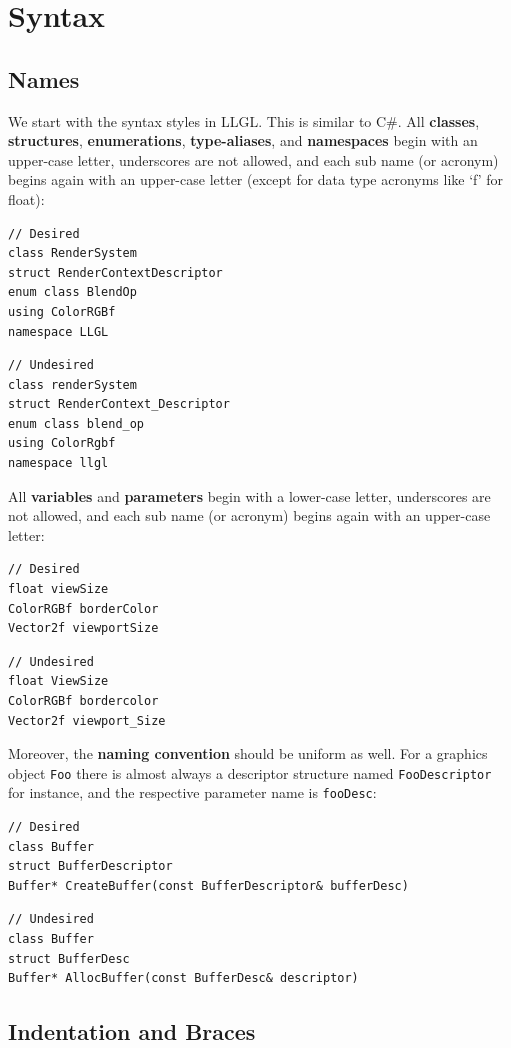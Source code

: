 \documentclass{article}
\begin{document}
\newpage
\section*{Syntax}

\subsection*{Names}

We start with the syntax styles in LLGL. This is similar to C\#.
All \textbf{classes}, \textbf{structures}, \textbf{enumerations}, \textbf{type-aliases},
and \textbf{namespaces} begin with an upper-case letter, underscores are not allowed,
and each sub name (or acronym) begins again with an upper-case letter (except for data type acronyms like `f' for float):
\begin{lstlisting}
// Desired
class RenderSystem
struct RenderContextDescriptor
enum class BlendOp
using ColorRGBf
namespace LLGL
\end{lstlisting}
\begin{lstlisting}
// Undesired
class renderSystem
struct RenderContext_Descriptor
enum class blend_op
using ColorRgbf
namespace llgl
\end{lstlisting}
All \textbf{variables} and \textbf{parameters} begin with a lower-case letter, underscores are not allowed,
and each sub name (or acronym) begins again with an upper-case letter:
\begin{lstlisting}
// Desired
float viewSize
ColorRGBf borderColor
Vector2f viewportSize
\end{lstlisting}
\begin{lstlisting}
// Undesired
float ViewSize
ColorRGBf bordercolor
Vector2f viewport_Size
\end{lstlisting}
Moreover, the \textbf{naming convention} should be uniform as well. For a graphics object \texttt{Foo}
there is almost always a descriptor structure named \texttt{FooDescriptor} for instance,
and the respective parameter name is \texttt{fooDesc}:
\begin{lstlisting}
// Desired
class Buffer
struct BufferDescriptor
Buffer* CreateBuffer(const BufferDescriptor& bufferDesc)
\end{lstlisting}
\begin{lstlisting}
// Undesired
class Buffer
struct BufferDesc
Buffer* AllocBuffer(const BufferDesc& descriptor)
\end{lstlisting}

\subsection*{Indentation and Braces}
\end{document}
